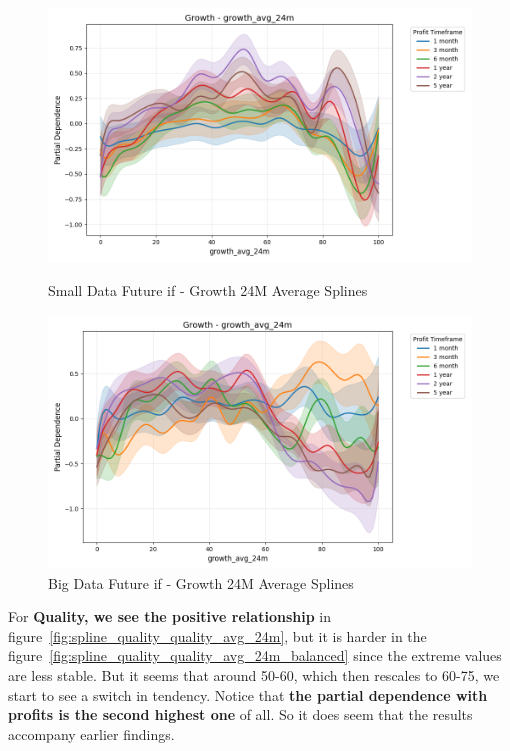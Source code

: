 \documentclass[11pt,english,a4paper,hidelinks]{book}
\begin{document}
\begin{figure}[H]
    \centering
    \begin{minipage}{0.48\textwidth}
        \centering
        \includegraphics[width=\textwidth]{images/code/models/general_regression/splines/2D/Small Data future - IF/growth_growth_avg_24m.png}
        \caption{Small Data Future \acrshort{if} - Growth 24M Average Splines}
        \label{fig:spline_growth_growth_avg_24m}
    \end{minipage}\hfill
    \begin{minipage}{0.48\textwidth}
        \centering
        \includegraphics[width=\textwidth]{images/code/models/general_regression/splines/2D/Big Data future - IF HARD Balanced/growth_growth_avg_24m.png}
        \caption{Big Data Future \acrshort{if} - Growth 24M Average Splines}
        \label{fig:spline_growth_growth_avg_24m_balanced}
    \end{minipage}
\end{figure}

\noindent For \textbf{Quality, we see the positive relationship} in figure~\ref{fig:spline_quality_quality_avg_24m}, but it is harder in the figure~\ref{fig:spline_quality_quality_avg_24m_balanced} since the extreme values are less stable. But it seems that around 50-60, which then rescales to 60-75, we start to see a switch in tendency. Notice that \textbf{the partial dependence with profits is the second highest one} of all. So it does seem that the results accompany earlier findings.
\end{document}
